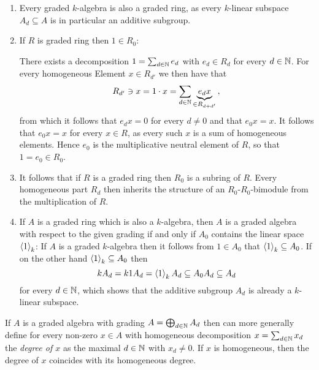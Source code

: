 \begin{remark}
  \label{remark: connection between graded algebras and rings}
  \leavevmode
  \begin{enumerate}
    \item
      Every graded $k$-algebra is also a graded ring, as every $k$-linear subspace $A_d \subseteq A$ is in particular an additive subgroup.
    \item
      \label{enumerate: unit is in degree 0}
      If $R$ is graded ring then $1 \in R_0$:
      
      There exists a decomposition $1 = \sum_{d \in \mathbb{N}} e_d$ with $e_d \in R_d$ for every $d \in \mathbb{N}$.
      For every homogeneous Element $x \in R_{d'}$ we then have that
      \[
            R_{d'}
        \ni x
        =   1 \cdot x
        =   \sum_{d \in \mathbb{N}} \underbrace{e_d x}_{\in R_{d+d'}} \,,
      \]
      from which it follows that $e_d x = 0$ for every $d \neq 0$ and that $e_0 x = x$.
      It follows that $e_0 x = x$ for every $x \in R$, as every such $x$ is a sum of homogeneous elements.
      Hence $e_0$ is the multiplicative neutral element of $R$, so that $1 = e_0 \in R_0$.
    \item
      It follows that if $R$ is a graded ring then $R_0$ is a subring of $R$.
      Every homogeneous part $R_d$ then inherits the structure of an $R_0$-$R_0$-bimodule from the multiplication of $R$.
    \item
      If $A$ is a graded ring which is also a $k$-algebra, then $A$ is a graded algebra with respect to the given grading if and only if $A_0$ contains the linear space $\left\langle 1 \right\rangle_k$:
      If $A$ is a graded $k$-algebra then it follows from $1 \in A_0$ that $\left\langle 1 \right\rangle_k \subseteq A_0$.
      If on the other hand $\left\langle 1 \right\rangle_k \subseteq A_0$ then
      \[
                  k A_d
        =         k 1 A_d
        =         \left\langle 1 \right\rangle_k A_d
        \subseteq A_0 A_d
        \subseteq A_d
      \]
      for every $d \in \mathbb{N}$, which shows that the additive subgroup $A_d$ is already a $k$-linear subspace.
  \end{enumerate}
\end{remark}


\begin{remark}
  \label{remark: general definition of degree}
  If $A$ is a graded algebra with grading $A = \bigoplus_{d \in \mathbb{N}} A_d$ then can more generally define for every non-zero $x \in A$ with homogeneous decomposition $x = \sum_{d \in \mathbb{N}} x_d$ the \emph{degree of $x$} as the maximal $d \in \mathbb{N}$ with $x_d \neq 0$.
  If $x$ is homogeneous, then the degree of $x$ coincides with its homogeneous degree.
\end{remark}


